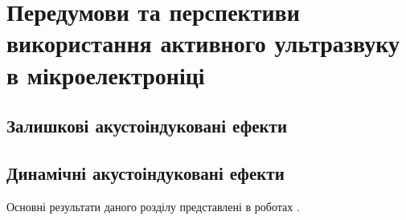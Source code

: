 \chapter{Передумови та перспективи використання активного ультразвуку в мікроелектроніці\label{Oglyad}}
\section{Залишкові акустоіндуковані ефекти}
\section{Динамічні акустоіндуковані ефекти}


Основні результати даного розділу представлені в роботах \cite{Olikh:SEMT2004,Olikh:SEMT2011,1UNCPS,2013Buk}.

